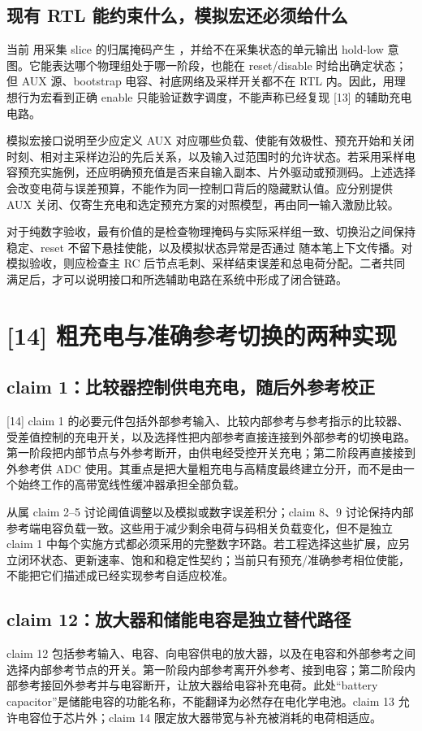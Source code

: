 \subsection{现有 RTL 能约束什么，模拟宏还必须给什么}
当前  用采集 slice 的归属掩码产生 ，并给不在采集状态的单元输出 hold-low 意图。它能表达哪个物理组处于哪一阶段，也能在 reset/disable 时给出确定状态；但 AUX 源、bootstrap 电容、衬底网络及采样开关都不在 RTL 内。因此，用理想行为宏看到正确 enable 只能验证数字调度，不能声称已经复现 [13] 的辅助充电电路。

模拟宏接口说明至少应定义 AUX 对应哪些负载、使能有效极性、预充开始和关闭时刻、相对主采样边沿的先后关系，以及输入过范围时的允许状态。若采用采样电容预充实施例，还应明确预充值是否来自输入副本、片外驱动或预测码。上述选择会改变电荷与误差预算，不能作为同一控制口背后的隐藏默认值。应分别提供 AUX 关闭、仅寄生充电和选定预充方案的对照模型，再由同一输入激励比较。

对于纯数字验收，最有价值的是检查物理掩码与实际采样组一致、切换沿之间保持稳定、reset 不留下悬挂使能，以及模拟状态异常是否通过  随本笔上下文传播。对模拟验收，则应检查主 RC 后节点毛刺、采样结束误差和总电荷分配。二者共同满足后，才可以说明接口和所选辅助电路在系统中形成了闭合链路。

\section{[14] 粗充电与准确参考切换的两种实现}
\subsection{claim 1：比较器控制供电充电，随后外参考校正}
[14] claim 1 的必要元件包括外部参考输入、比较内部参考与参考指示的比较器、受差值控制的充电开关，以及选择性把内部参考直接连接到外部参考的切换电路。第一阶段把内部节点与外参考断开，由供电经受控开关充电；第二阶段再直接接到外参考供 ADC 使用。其重点是把大量粗充电与高精度最终建立分开，而不是由一个始终工作的高带宽线性缓冲器承担全部负载。

从属 claim 2--5 讨论阈值调整以及模拟或数字误差积分；claim 8、9 讨论保持内部参考端电容负载一致。这些用于减少剩余电荷与码相关负载变化，但不是独立 claim 1 中每个实施方式都必须采用的完整数字环路。若工程选择这些扩展，应另立闭环状态、更新速率、饱和和稳定性契约；当前只有预充/准确参考相位使能，不能把它们描述成已经实现参考自适应校准。

\subsection{claim 12：放大器和储能电容是独立替代路径}
claim 12 包括参考输入、电容、向电容供电的放大器，以及在电容和外部参考之间选择内部参考节点的开关。第一阶段内部参考离开外参考、接到电容；第二阶段内部参考接回外参考并与电容断开，让放大器给电容补充电荷。此处“battery capacitor”是储能电容的功能名称，不能翻译为必然存在电化学电池。claim 13 允许电容位于芯片外；claim 14 限定放大器带宽与补充被消耗的电荷相适应。

